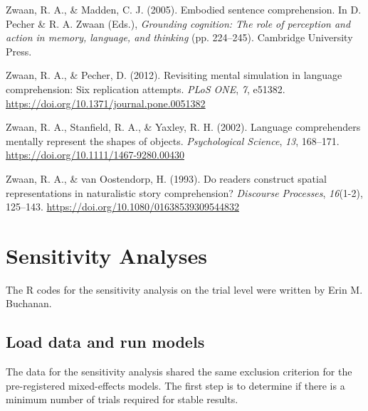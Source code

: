 \documentclass[
  man,floatsintext]{apa7}
\newlength{\cslhangindent}
\newlength{\cslentryspacingunit} %
\newenvironment{CSLReferences}[2] %
 {%
  \setlength{\parindent}{0pt}
  \ifodd #1
  \let\oldpar\par
  \def\par{\hangindent=\cslhangindent\oldpar}
  \fi
  \setlength{\parskip}{#2\cslentryspacingunit}
 }%
 {}
\begin{document}
\begin{CSLReferences}{1}{0}
\leavevmode{}%
Zwaan, R. A., \& Madden, C. J. (2005). Embodied sentence comprehension. In D. Pecher \& R. A. Zwaan (Eds.), \emph{Grounding cognition: {The} role of perception and action in memory, language, and thinking} (pp. 224--245). {Cambridge University Press}.

\leavevmode{}%
Zwaan, R. A., \& Pecher, D. (2012). Revisiting mental simulation in language comprehension: Six replication attempts. \emph{PLoS ONE}, \emph{7}, e51382. \url{https://doi.org/10.1371/journal.pone.0051382}

\leavevmode{}%
Zwaan, R. A., Stanfield, R. A., \& Yaxley, R. H. (2002). Language comprehenders mentally represent the shapes of objects. \emph{Psychological Science}, \emph{13}, 168--171. \url{https://doi.org/10.1111/1467-9280.00430}

\leavevmode{}%
Zwaan, R. A., \& van Oostendorp, H. (1993). Do readers construct spatial representations in naturalistic story comprehension? \emph{Discourse Processes}, \emph{16}(1-2), 125--143. \url{https://doi.org/10.1080/01638539309544832}

\end{CSLReferences}

\newpage

\hypertarget{appendix-appendix}{%
\appendix}


\hypertarget{sensitivity-analyses}{%
\section{Sensitivity Analyses}\label{sensitivity-analyses}}

The R codes for the sensitivity analysis on the trial level were written by Erin M. Buchanan.

\hypertarget{load-data-and-run-models}{%
\subsection{Load data and run models}\label{load-data-and-run-models}}

The data for the sensitivity analysis shared the same exclusion criterion for the pre-registered mixed-effects models. The first step is to determine if there is a minimum number of trials required for stable results.
\end{document}
